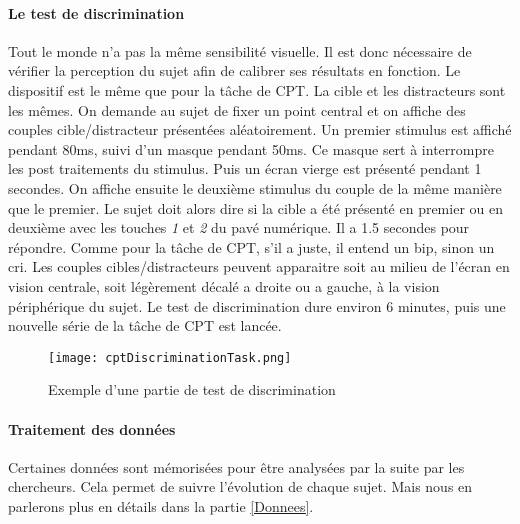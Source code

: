 \paragraph{Le test de discrimination}Tout le monde n'a pas la même sensibilité visuelle. Il est donc nécessaire de vérifier la perception du sujet afin de calibrer ses résultats en
fonction. Le dispositif est le même que pour la tâche de CPT. La cible et les distracteurs sont les mêmes. On demande au sujet de fixer un point central et on affiche des couples
cible/distracteur présentées aléatoirement. Un premier stimulus est affiché pendant 80ms, suivi d'un masque pendant 50ms. Ce masque sert à interrompre les post traitements du
stimulus. Puis un écran vierge est présenté pendant 1 secondes. On affiche ensuite le deuxième stimulus du couple de la même manière que le premier. Le sujet doit alors dire si la
cible a été présenté en premier ou en deuxième avec les touches \emph{1} et \emph{2} du pavé numérique. Il a 1.5 secondes pour répondre. Comme pour la tâche de CPT, s'il a juste, il
entend un bip, sinon un cri. Les couples cibles/distracteurs peuvent apparaitre soit au milieu de l'écran en vision centrale, soit légèrement décalé a droite ou a gauche, à la vision
périphérique du sujet. Le test de discrimination dure environ 6 minutes, puis une nouvelle série de la tâche de CPT est lancée.

\begin{figure}[H]
    \begin{center}
    \texttt{[image: cptDiscriminationTask.png]}
    \end{center}
    \caption{Exemple d'une partie de test de discrimination}
\label{CptDiscriminationTask}
\end{figure}

\paragraph{Traitement des données}Certaines données sont mémorisées pour être analysées par la suite par les chercheurs. Cela permet de suivre l'évolution de chaque sujet. Mais nous
en parlerons plus en détails dans la partie \ref{Donnees}.

